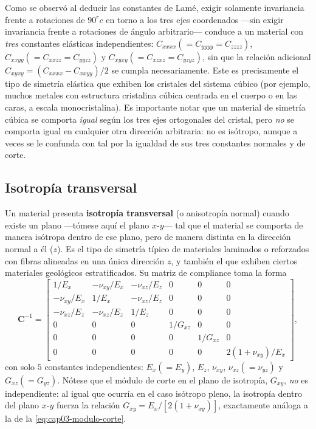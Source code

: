 Como se observó al deducir las constantes de Lamé, exigir solamente invariancia frente a rotaciones de $90^	rc$ en torno a los tres ejes coordenados —sin exigir invariancia frente a rotaciones de ángulo arbitrario— conduce a un material con \emph{tres} constantes elásticas independientes: $C_{xxxx}(=C_{yyyy}=C_{zzzz})$, $C_{xxyy}(=C_{xxzz}=C_{yyzz})$ y $C_{xyxy}(=C_{xzxz}=C_{yzyz})$, sin que la relación adicional $C_{xyxy}=(C_{xxxx}-C_{xxyy})/2$ se cumpla necesariamente. Este es precisamente el tipo de simetría elástica que exhiben los cristales del sistema cúbico (por ejemplo, muchos metales con estructura cristalina cúbica centrada en el cuerpo o en las caras, a escala monocristalina). Es importante notar que un material de simetría cúbica se comporta \emph{igual} según los tres ejes ortogonales del cristal, pero \emph{no} se comporta igual en cualquier otra dirección arbitraria: no es isótropo, aunque a veces se le confunda con tal por la igualdad de sus tres constantes normales y de corte.

\subsection{Isotropía transversal}

Un material presenta \textbf{isotropía transversal} (o anisotropía normal) cuando existe un plano —tómese aquí el plano $x$-$y$— tal que el material se comporta de manera isótropa dentro de ese plano, pero de manera distinta en la dirección normal a él ($z$). Es el tipo de simetría típico de materiales laminados o reforzados con fibras alineadas en una única dirección $z$, y también el que exhiben ciertos materiales geológicos estratificados. Su matriz de compliance toma la forma
\[
\bm C^{-1} =
\begin{bmatrix}
1/E_x & -\nu_{xy}/E_x & -\nu_{xz}/E_z & 0 & 0 & 0 \\
-\nu_{xy}/E_x & 1/E_x & -\nu_{xz}/E_z & 0 & 0 & 0 \\
-\nu_{xz}/E_z & -\nu_{xz}/E_z & 1/E_z & 0 & 0 & 0 \\
0 & 0 & 0 & 1/G_{xz} & 0 & 0 \\
0 & 0 & 0 & 0 & 1/G_{xz} & 0 \\
0 & 0 & 0 & 0 & 0 & 2(1+\nu_{xy})/E_x
\end{bmatrix},
\]
con solo $\boxed{5}$ constantes independientes: $E_x(=E_y)$, $E_z$, $\nu_{xy}$, $\nu_{xz}(=\nu_{yz})$ y $G_{xz}(=G_{yz})$. Nótese que el módulo de corte en el plano de isotropía, $G_{xy}$, \emph{no} es independiente: al igual que ocurría en el caso isótropo pleno, la isotropía dentro del plano $x$-$y$ fuerza la relación $G_{xy}=E_x/[2(1+\nu_{xy})]$, exactamente análoga a la de la \cref{eq:cap03-modulo-corte}.

